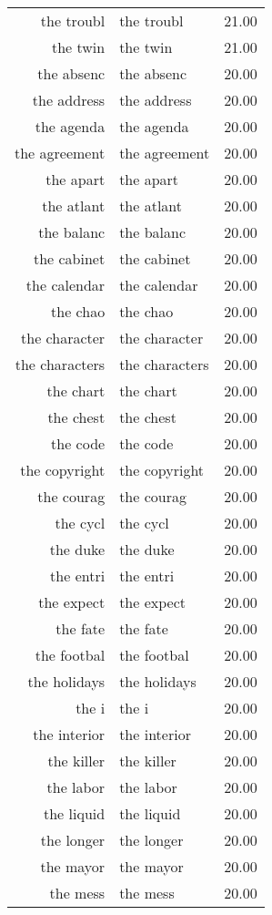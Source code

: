 \begin{table}[ht]
\begin{tabular}{rlr}
  the troubl & the troubl & 21.00 \\ 
  the twin & the twin & 21.00 \\ 
  the absenc & the absenc & 20.00 \\ 
  the address & the address & 20.00 \\ 
  the agenda & the agenda & 20.00 \\ 
  the agreement & the agreement & 20.00 \\ 
  the apart & the apart & 20.00 \\ 
  the atlant & the atlant & 20.00 \\ 
  the balanc & the balanc & 20.00 \\ 
  the cabinet & the cabinet & 20.00 \\ 
  the calendar & the calendar & 20.00 \\ 
  the chao & the chao & 20.00 \\ 
  the character & the character & 20.00 \\ 
  the characters & the characters & 20.00 \\ 
  the chart & the chart & 20.00 \\ 
  the chest & the chest & 20.00 \\ 
  the code & the code & 20.00 \\ 
  the copyright & the copyright & 20.00 \\ 
  the courag & the courag & 20.00 \\ 
  the cycl & the cycl & 20.00 \\ 
  the duke & the duke & 20.00 \\ 
  the entri & the entri & 20.00 \\ 
  the expect & the expect & 20.00 \\ 
  the fate & the fate & 20.00 \\ 
  the footbal & the footbal & 20.00 \\ 
  the holidays & the holidays & 20.00 \\ 
  the i & the i & 20.00 \\ 
  the interior & the interior & 20.00 \\ 
  the killer & the killer & 20.00 \\ 
  the labor & the labor & 20.00 \\ 
  the liquid & the liquid & 20.00 \\ 
  the longer & the longer & 20.00 \\ 
  the mayor & the mayor & 20.00 \\ 
  the mess & the mess & 20.00 \\ 

\end{tabular}
\end{table}
